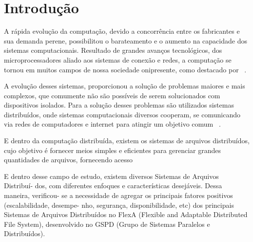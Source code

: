 \chapter{Introdução}

A rápida evolução da computação, devido a concorrência entre os fabricantes e sua demanda perene, possibilitou o barateamento e o aumento na capacidade dos sistemas computacionais. Resultado de grandes avanços tecnológicos, dos microprocessadores aliado aos sistemas de conexão e redes, a computação se tornou em muitos campos de nossa sociedade onipresente, como destacado por ~\cite{coulouris}.

A evolução desses sistemas, proporcionou a solução de problemas maiores e mais complexos, que comumente não são possíveis de serem solucionados com dispositivos isolados. Para a solução desses problemas são utilizados sistemas distribuídos, onde sistemas computacionais diversos cooperam, se comunicando via redes de computadores e internet para atingir um objetivo comum ~\cite{tanenbaum}.

E dentro da computação distribuída, existem os sistemas de arquivos distribuídos, cujo objetivo é fornecer meios simples e eficientes para gerenciar grandes quantidades de arquivos, fornecendo acesso


E dentro desse campo de estudo, existem diversos Sistemas de Arquivos Distribuí-
dos, com diferentes enfoques e características desejáveis. Dessa maneira, verificou-
se a necessidade de agregar os principais fatores positivos (escalabilidade, desempe-
nho, segurança, disponibilidade, etc) dos principais Sistemas de Arquivos Distribuídos
no FlexA (Flexible and Adaptable Distributed File System), desenvolvido no GSPD
(Grupo de Sistemas Paralelos e Distribuídos).

